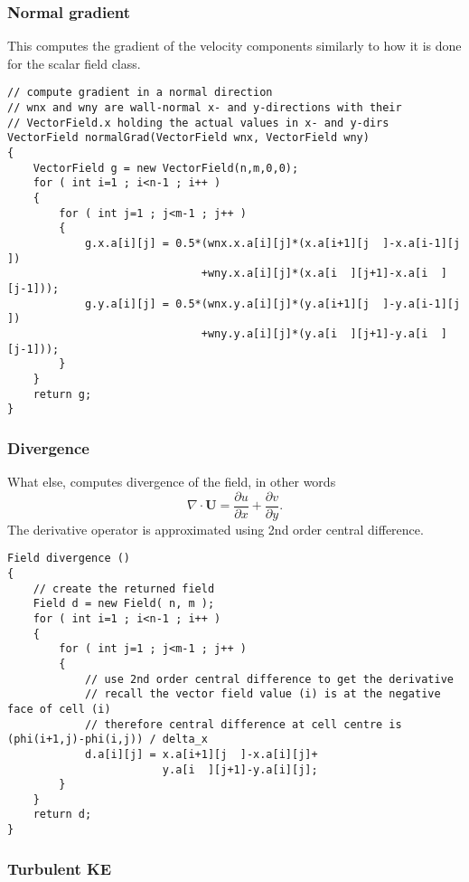 \documentclass[notitlepage]{article}
\begin{document}
\subsubsection{Normal gradient}

This computes the gradient of the velocity components similarly to how it is done for the scalar
field class.

\begin{lstlisting}[style=myCpp]
// compute gradient in a normal direction
// wnx and wny are wall-normal x- and y-directions with their
// VectorField.x holding the actual values in x- and y-dirs
VectorField normalGrad(VectorField wnx, VectorField wny)
{
	VectorField g = new VectorField(n,m,0,0);
	for ( int i=1 ; i<n-1 ; i++ )
	{
		for ( int j=1 ; j<m-1 ; j++ )
		{
			g.x.a[i][j] = 0.5*(wnx.x.a[i][j]*(x.a[i+1][j  ]-x.a[i-1][j  ])
							  +wny.x.a[i][j]*(x.a[i  ][j+1]-x.a[i  ][j-1]));
			g.y.a[i][j] = 0.5*(wnx.y.a[i][j]*(y.a[i+1][j  ]-y.a[i-1][j  ])
							  +wny.y.a[i][j]*(y.a[i  ][j+1]-y.a[i  ][j-1]));
		}
	}
	return g; 
}
\end{lstlisting}

\subsubsection{Divergence}

What else, computes divergence of the field, in other words
%
\begin{equation}
\nabla \cdot \mathbf{U} = \frac{\partial u}{\partial x} + \frac{\partial v}{\partial y} .
\end{equation}
%
The derivative operator is approximated using 2nd order central difference.

\begin{lstlisting}[style=myCpp]
Field divergence ()
{
	// create the returned field
	Field d = new Field( n, m );
	for ( int i=1 ; i<n-1 ; i++ )
	{
		for ( int j=1 ; j<m-1 ; j++ )
		{
			// use 2nd order central difference to get the derivative
			// recall the vector field value (i) is at the negative face of cell (i)
			// therefore central difference at cell centre is (phi(i+1,j)-phi(i,j)) / delta_x
			d.a[i][j] = x.a[i+1][j  ]-x.a[i][j]+
						y.a[i  ][j+1]-y.a[i][j];
		}
	}
	return d;
}
\end{lstlisting}

\subsubsection{Turbulent KE}
\end{document}
